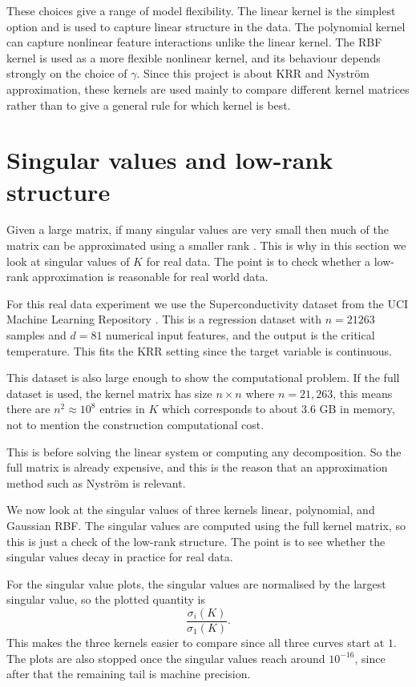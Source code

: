 These choices give a range of model flexibility. The linear kernel is the simplest option and is used to capture linear structure in the data. The polynomial kernel can capture nonlinear feature interactions unlike the linear kernel. The RBF kernel is used as a more flexible nonlinear kernel, and its behaviour depends strongly on the choice of $\gamma$. Since this project is about KRR and Nystr\"om approximation, these kernels are used mainly to compare different kernel matrices rather than to give a general rule for which kernel is best.

\section{Singular values and low-rank structure}

Given a large matrix, if many singular values are very small then much of the matrix can be approximated using a smaller rank \citep{eckart1936approximation}. This is why in this section we look at singular values of $K$ for real data. The point is to check whether a low-rank approximation is reasonable for real world data.

For this real data experiment we use the Superconductivity dataset from the UCI Machine Learning Repository \citep{superconductivty_data_464}. This is a regression dataset with $n=21263$ samples and $d=81$ numerical input features, and the output is the critical temperature. This fits the KRR setting since the target variable is continuous.

This dataset is also large enough to show the computational problem. If the full dataset is used, the kernel matrix has size $n\times n$ where $n=21,263$, this means there are $n^2 \approx 10^8$ entries in $K$ which corresponds to about 3.6 GB in memory, not to mention the construction computational cost. 

This is before solving the linear system or computing any decomposition. So the full matrix is already expensive, and this is the reason that an approximation method such as Nystr\"om is relevant.

We now look at the singular values of three kernels linear, polynomial, and Gaussian RBF. The singular values are computed using the full kernel matrix, so this is just a check of the low-rank structure. The point is to see whether the singular values decay in practice for real data. 

For the singular value plots, the singular values are normalised by the largest singular value, so the plotted quantity is
\[
\frac{\sigma_i(K)}{\sigma_1(K)}.
\]
This makes the three kernels easier to compare since all three curves start at $1$. The plots are also stopped once the singular values reach around $10^{-16}$, since after that the remaining tail is machine precision.

